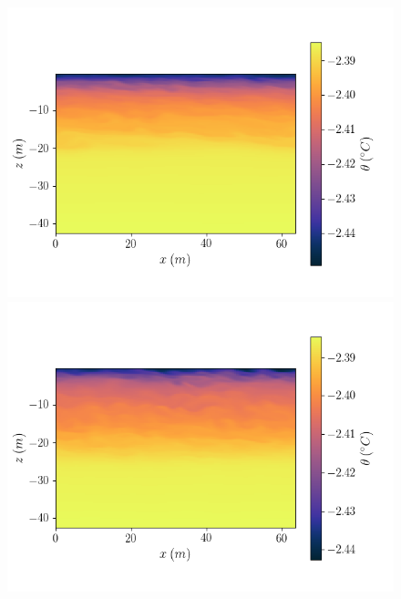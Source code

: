 \documentclass[draft]{agujournal2019}
\begin{document}
\begin{figure}[h!]
    \centering
    \begin{minipage}{0.4\textwidth}
        \includegraphics[trim={0 1cm 4cm 1cm},clip,width=\textwidth]{Figures/dslope2/pt_xz_y64_zmax42_t40.png}
    \end{minipage}%
    \begin{minipage}{0.55\textwidth}
        \includegraphics[trim={0 1cm 0 1cm},clip,width=\textwidth]{Figures/dT1/pt_xz_y64_zmax42_t40.png}
    \end{minipage}
    \begin{minipage}{0.4\textwidth}

\end{minipage}
\end{figure}
\end{document}
